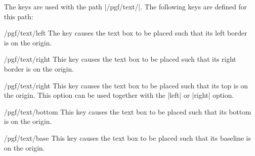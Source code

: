 \begin{command}{\pgftext{}}
  The  keys are used with the path |/pgf/text/|. The
  following keys are defined for this path:
  \begin{key}{/pgf/text/left}
    The key causes the text box to be placed such that its left
    border is on the origin. 
\begin{codeexample}[]
\end{codeexample}
  \end{key}
  \begin{key}{/pgf/text/right}
    Thie key causes the text box to be placed such that its right
    border is on the origin. 
\begin{codeexample}[]
\end{codeexample}
  \end{key}
  \begin{key}{/pgf/text/right}
    This key causes the text box to be placed such that its top is on the
    origin. This option can be used together with the |left| or
    |right| option.
\begin{codeexample}[]
\end{codeexample}
\begin{codeexample}[]
\end{codeexample}
  \end{key}
  \begin{key}{/pgf/text/bottom}
    This key causes the text box to be placed such that its bottom is
    on the origin.
\begin{codeexample}[]
\end{codeexample}
\begin{codeexample}[]
\end{codeexample}
  \end{key}
  \begin{key}{/pgf/text/base}
    This key causes the text box to be placed such that its baseline
    is on the origin.
\begin{codeexample}[]
\end{codeexample}
\begin{codeexample}[]

\end{codeexample}
\end{key}
\end{command}
